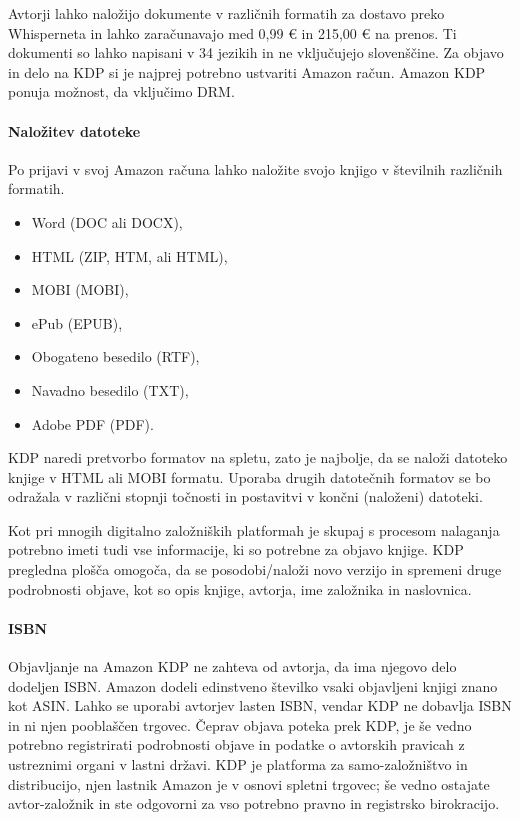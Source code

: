 \documentclass[a4paper, 12pt]{book}
\begin{document}
Avtorji lahko naložijo dokumente v različnih formatih za dostavo preko Whisperneta in lahko zaračunavajo med 0,99 \euro{} in 215,00 \euro{} na prenos. \cite{44} Ti dokumenti so lahko napisani v 34 jezikih in ne vključujejo slovenščine. \cite{45} Za objavo in delo na KDP si je najprej potrebno ustvariti Amazon račun. Amazon KDP ponuja možnost, da vključimo DRM.

\paragraph{Naložitev datoteke}
Po prijavi v svoj Amazon računa lahko naložite svojo knjigo v številnih različnih formatih. 
\begin{itemize}
	\item Word (DOC ali DOCX),
	\item HTML (ZIP, HTM, ali HTML),
	\item MOBI (MOBI),
	\item ePub (EPUB),
	\item Obogateno besedilo (RTF),
	\item Navadno besedilo (TXT),
	\item Adobe PDF (PDF).
\end{itemize}
KDP naredi pretvorbo formatov na spletu, zato je najbolje, da se naloži datoteko knjige v HTML ali MOBI formatu. Uporaba drugih datotečnih formatov se bo odražala v različni stopnji točnosti in postavitvi v končni (naloženi) datoteki.

Kot pri mnogih digitalno založniških platformah je skupaj s procesom nalaganja potrebno imeti tudi vse informacije, ki so potrebne za objavo knjige. KDP pregledna plošča omogoča, da se posodobi/naloži novo verzijo in spremeni druge podrobnosti objave, kot so opis knjige, avtorja, ime založnika in naslovnica.

\paragraph{ISBN}
Objavljanje na Amazon KDP ne zahteva od avtorja, da ima njegovo delo dodeljen ISBN. Amazon dodeli edinstveno številko vsaki objavljeni knjigi znano kot ASIN. Lahko se uporabi avtorjev lasten ISBN, vendar KDP ne dobavlja ISBN in ni njen pooblaščen trgovec. Čeprav objava poteka prek KDP, je še vedno potrebno registrirati podrobnosti objave in podatke o avtorskih pravicah z ustreznimi organi v lastni državi. KDP je platforma za samo-založništvo in distribucijo, njen lastnik Amazon je v osnovi spletni trgovec; še vedno ostajate avtor-založnik in ste odgovorni za vso potrebno pravno in registrsko birokracijo.
\end{document}
